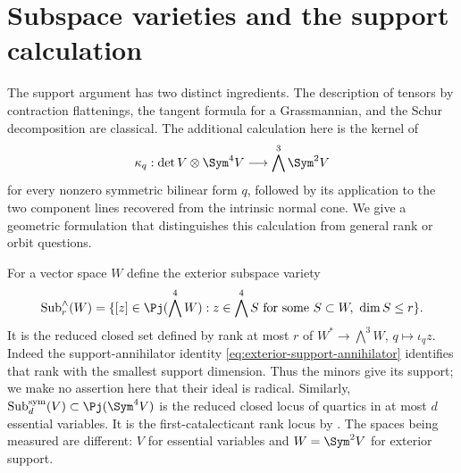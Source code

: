 \section{Subspace varieties and the support calculation}
\label{sec:support-literature}

The support argument has two distinct ingredients.  The description
of tensors by contraction flattenings, the tangent formula for a
Grassmannian, and the Schur decomposition are classical.  The
additional calculation here is the kernel of
\[
 \kappa_q:\det V\otimes\Sym^4V\longrightarrow
                     \bigwedge^3\Sym^2V
\]
for every nonzero symmetric bilinear form \(q\), followed by its
application to the two component lines recovered from the intrinsic
normal cone.  We give a geometric formulation that distinguishes this
calculation from general rank or orbit questions.

For a vector space \(W\) define the exterior subspace variety
\[
 \operatorname{Sub}^{\wedge}_r(W)
   =\{[z]\in\Pj(\bigwedge^4W):
          z\in\bigwedge^4S\text{ for some }S\subset W,\ \dim S\le r\}.
\]
It is the reduced closed set defined by rank at most \(r\) of
\(W^*\to\bigwedge^3W\), \(q\mapsto\iota_qz\).
Indeed the support-annihilator identity
\eqref{eq:exterior-support-annihilator} identifies that rank with
the smallest support dimension.  Thus the minors give its support;
we make no assertion here that their ideal is radical.  Similarly,
\(\operatorname{Sub}^{\mathrm{sym}}_d(V)\subset\Pj(\Sym^4V)\)
is the reduced closed locus of quartics in at most \(d\) essential
variables.  It is the first-catalecticant rank locus by
\cite[Proposition~1]{Carlini}.  The spaces being measured are different:
\(V\) for essential variables and \(W=\Sym^2V\) for exterior support.

